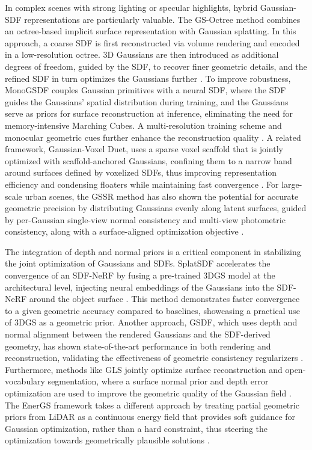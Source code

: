 \documentclass[11pt]{article}
\begin{document}
In complex scenes with strong lighting or specular highlights, hybrid Gaussian-SDF representations are particularly valuable. The GS-Octree method combines an octree-based implicit surface representation with Gaussian splatting. In this approach, a coarse SDF is first reconstructed via volume rendering and encoded in a low-resolution octree. 3D Gaussians are then introduced as additional degrees of freedom, guided by the SDF, to recover finer geometric details, and the refined SDF in turn optimizes the Gaussians further \cite{ref203}. To improve robustness, MonoGSDF couples Gaussian primitives with a neural SDF, where the SDF guides the Gaussians' spatial distribution during training, and the Gaussians serve as priors for surface reconstruction at inference, eliminating the need for memory-intensive Marching Cubes. A multi-resolution training scheme and monocular geometric cues further enhance the reconstruction quality \cite{ref188}. A related framework, Gaussian-Voxel Duet, uses a sparse voxel scaffold that is jointly optimized with scaffold-anchored Gaussians, confining them to a narrow band around surfaces defined by voxelized SDFs, thus improving representation efficiency and condensing floaters while maintaining fast convergence \cite{ref95}. For large-scale urban scenes, the GSSR method has also shown the potential for accurate geometric precision by distributing Gaussians evenly along latent surfaces, guided by per-Gaussian single-view normal consistency and multi-view photometric consistency, along with a surface-aligned optimization objective \cite{ref204}.

The integration of depth and normal priors is a critical component in stabilizing the joint optimization of Gaussians and SDFs. SplatSDF accelerates the convergence of an SDF-NeRF by fusing a pre-trained 3DGS model at the architectural level, injecting neural embeddings of the Gaussians into the SDF-NeRF around the object surface \cite{ref205}. This method demonstrates faster convergence to a given geometric accuracy compared to baselines, showcasing a practical use of 3DGS as a geometric prior. Another approach, GSDF, which uses depth and normal alignment between the rendered Gaussians and the SDF-derived geometry, has shown state-of-the-art performance in both rendering and reconstruction, validating the effectiveness of geometric consistency regularizers \cite{ref198}. Furthermore, methods like GLS jointly optimize surface reconstruction and open-vocabulary segmentation, where a surface normal prior and depth error optimization are used to improve the geometric quality of the Gaussian field \cite{ref206}. The EnerGS framework takes a different approach by treating partial geometric priors from LiDAR as a continuous energy field that provides soft guidance for Gaussian optimization, rather than a hard constraint, thus steering the optimization towards geometrically plausible solutions \cite{ref194}.
\end{document}
